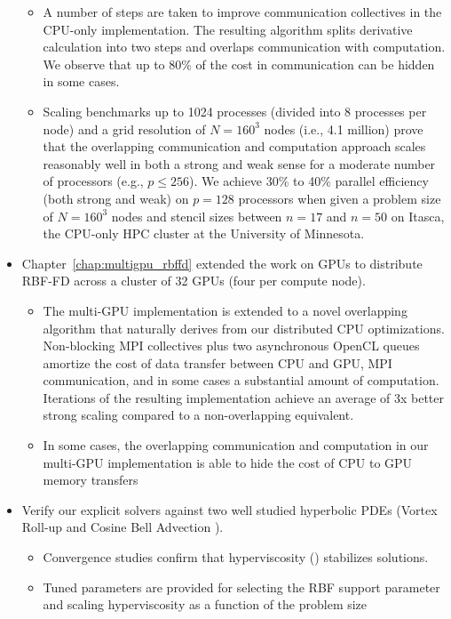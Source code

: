 \begin{itemize}
\begin{itemize}
\item A number of steps are taken to improve communication collectives in the CPU-only implementation. The resulting algorithm splits derivative calculation into two steps and overlaps communication with computation. We observe that up to 80\% of the cost in communication can be hidden in some cases. 

\item Scaling benchmarks up to 1024 processes (divided into 8 processes per node) and a grid resolution of $N=160^3$ nodes (i.e., 4.1 million) prove that the overlapping communication and computation approach scales reasonably well in both a strong and weak sense for a moderate number of processors (e.g., $p \leq 256$). We achieve 30\% to 40\% parallel efficiency (both strong and weak) on $p=128$ processors when given a problem size of $N=160^3$ nodes and stencil sizes between $n=17$ and $n=50$ on Itasca, the CPU-only HPC cluster at the University of Minnesota. %

\end{itemize} 

\item Chapter~\ref{chap:multigpu_rbffd} extended the work on GPUs to distribute RBF-FD across a cluster of 32 GPUs (four per compute node). %
\begin{itemize} 
\item The multi-GPU implementation is extended to a novel overlapping algorithm that naturally derives from our distributed CPU optimizations. Non-blocking MPI collectives plus two asynchronous OpenCL queues amortize the cost of data transfer between CPU and GPU, MPI communication, and in some cases a substantial amount of computation. Iterations of the resulting implementation achieve an average of 3x better strong scaling compared to a non-overlapping equivalent. 
\item In some cases, the overlapping communication and computation in our multi-GPU implementation is able to hide the cost of CPU to GPU memory transfers 
\end{itemize} 

\item Verify our explicit solvers against two well studied hyperbolic PDEs (Vortex Roll-up \cite{NairTransport05, NairJablonowski08} and Cosine Bell Advection \cite{JakobChien1995}).
\begin{itemize} 
\item Convergence studies confirm that hyperviscosity (\cite{Fornberg2011b}) stabilizes solutions.
\item Tuned parameters are provided for selecting the RBF support parameter and scaling hyperviscosity as a function of the problem size
\end{itemize}

\end{itemize} 


